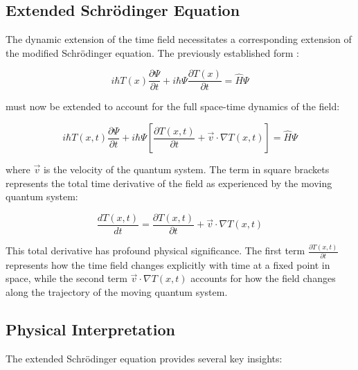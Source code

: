 \documentclass[12pt,a4paper]{article}
\newcommand{\Tfield}{T(x)}
\newcommand{\Tfieldt}{T(x,t)}
\newcommand{\pdTdt}{\frac{\partial\Tfieldt}{\partial t}}
\newcommand{\pdTdx}{\nabla\Tfieldt}
\begin{document}
	\subsection{Extended Schrödinger Equation}
	\label{subsec:extended_schrodinger}
	
	The dynamic extension of the time field necessitates a corresponding extension of the modified Schrödinger equation. The previously established form \cite{pascher_quantum_2025}:
	
	\begin{equation}
		i\hbar \Tfield \frac{\partial\Psi}{\partial t} + i\hbar \Psi \frac{\partial \Tfield}{\partial t} = \hat{H} \Psi
		\label{eq:original_schrodinger}
	\end{equation}
	
	must now be extended to account for the full space-time dynamics of the field:
	
	\begin{equation}
		i\hbar \Tfieldt \frac{\partial\Psi}{\partial t} + i\hbar \Psi \left[\frac{\partial \Tfieldt}{\partial t} + \vec{v}\cdot\nabla\Tfieldt\right] = \hat{H} \Psi
		\label{eq:dynamic_schrodinger}
	\end{equation}
	
	where $\vec{v}$ is the velocity of the quantum system. The term in square brackets represents the total time derivative of the field as experienced by the moving quantum system:
	
	\begin{equation}
		\frac{d\Tfieldt}{dt} = \frac{\partial \Tfieldt}{\partial t} + \vec{v}\cdot\nabla\Tfieldt
		\label{eq:total_derivative}
	\end{equation}
	
	This total derivative has profound physical significance. The first term $\pdTdt$ represents how the time field changes explicitly with time at a fixed point in space, while the second term $\vec{v}\cdot\pdTdx$ accounts for how the field changes along the trajectory of the moving quantum system.
	
	\subsection{Physical Interpretation}
	\label{subsec:quantum_interpretation}
	
	The extended Schrödinger equation provides several key insights:
	
\end{document}

